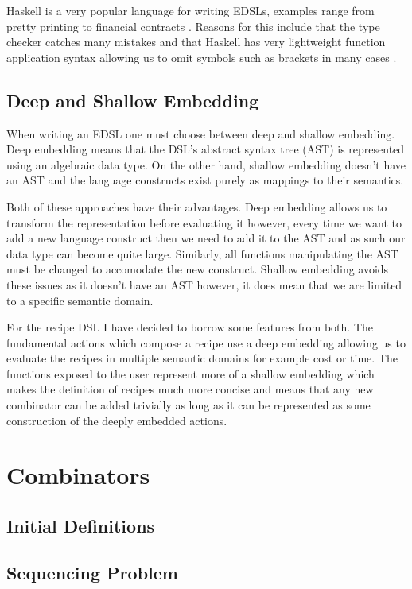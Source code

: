 \documentclass[11pt]{article}
\begin{document}
\medbreak

Haskell is a very popular language for writing EDSLs, examples
range from pretty printing \cite{pretty} to financial contracts \cite{contracts}.
Reasons for this include that the type checker catches many mistakes
and that Haskell has very lightweight function application syntax
allowing us to omit symbols such as brackets in many cases \cite{snoyman}.

\subsection{Deep and Shallow Embedding}
When writing an EDSL one must choose between deep and shallow embedding.
Deep embedding means that the DSL's abstract syntax tree (AST) is
represented using an algebraic data type. On the other hand, shallow
embedding doesn't have an AST and the language constructs exist purely
as mappings to their semantics.

\medbreak

Both of these approaches have their advantages. Deep embedding
allows us to transform the representation before evaluating
it however, every time we want to add a new language construct
then we need to add it to the AST and as such our data type
can become quite large. Similarly, all functions manipulating
the AST must be changed to accomodate the new construct. Shallow
embedding avoids these issues as it doesn't have an AST however,
it does mean that we are limited to a specific semantic domain.

\medbreak

For the recipe DSL I have decided to borrow some features from
both. The fundamental actions which compose a recipe use a
deep embedding allowing us to evaluate the recipes in multiple
semantic domains for example cost or time. The functions
exposed to the user represent more of a shallow embedding
which makes the definition of recipes much more concise and
means that any new combinator can be added trivially as long
as it can be represented as some construction of the deeply
embedded actions.

\section{Combinators}
\subsection{Initial Definitions}
\subsection{Sequencing Problem}
\end{document}
